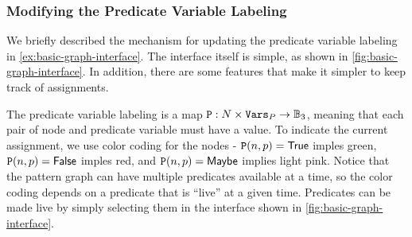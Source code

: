 \subsubsection{Modifying the Predicate Variable Labeling}
We briefly described the mechanism for updating the predicate variable labeling in
\autoref{ex:basic-graph-interface}. The interface itself is simple, as shown in
\autoref{fig:basic-graph-interface}. In addition, there are some features that make it
simpler to keep track of assignments.

The predicate variable labeling is a map
$\mathtt{P}: N \times \mathtt{Vars}_P \to \mathbb{B}_3$, meaning that each pair of node
and predicate variable must have a value. To indicate the current assignment, we use
color coding for the nodes - $\mathtt{P}(n, p) = \mathsf{True}$ imples green,
$\mathtt{P}(n, p) = \mathsf{False}$ imples red, and $\mathtt{P}(n, p) = \mathsf{Maybe}$ implies light
pink. Notice that the pattern graph can have multiple predicates available at a time, so
the color coding depends on a predicate that is ``live'' at a given time. Predicates can
be made live by simply selecting them in the interface shown in
\autoref{fig:basic-graph-interface}.

